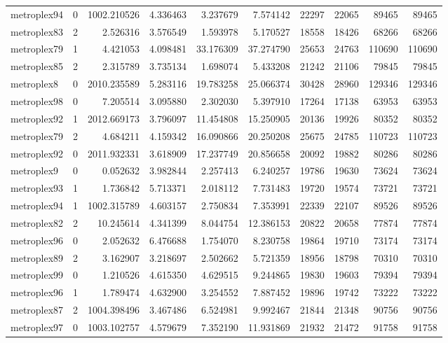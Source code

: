 \begin{longtable}{|l|r|r|r|r|r|r|r|r|r|}
metroplex94 & 0 & 1002.210526 & 4.336463 & 3.237679 & 7.574142 & 22297 & 22065 & 89465 & 89465 \\
metroplex83 & 2 & 2.526316 & 3.576549 & 1.593978 & 5.170527 & 18558 & 18426 & 68266 & 68266 \\
metroplex79 & 1 & 4.421053 & 4.098481 & 33.176309 & 37.274790 & 25653 & 24763 & 110690 & 110690 \\
metroplex85 & 2 & 2.315789 & 3.735134 & 1.698074 & 5.433208 & 21242 & 21106 & 79845 & 79845 \\
metroplex8 & 0 & 2010.235589 & 5.283116 & 19.783258 & 25.066374 & 30428 & 28960 & 129346 & 129346 \\
metroplex98 & 0 & 7.205514 & 3.095880 & 2.302030 & 5.397910 & 17264 & 17138 & 63953 & 63953 \\
metroplex92 & 1 & 2012.669173 & 3.796097 & 11.454808 & 15.250905 & 20136 & 19926 & 80352 & 80352 \\
metroplex79 & 2 & 4.684211 & 4.159342 & 16.090866 & 20.250208 & 25675 & 24785 & 110723 & 110723 \\
metroplex92 & 0 & 2011.932331 & 3.618909 & 17.237749 & 20.856658 & 20092 & 19882 & 80286 & 80286 \\
metroplex9 & 0 & 0.052632 & 3.982844 & 2.257413 & 6.240257 & 19786 & 19630 & 73624 & 73624 \\
metroplex93 & 1 & 1.736842 & 5.713371 & 2.018112 & 7.731483 & 19720 & 19574 & 73721 & 73721 \\
metroplex94 & 1 & 1002.315789 & 4.603157 & 2.750834 & 7.353991 & 22339 & 22107 & 89526 & 89526 \\
metroplex82 & 2 & 10.245614 & 4.341399 & 8.044754 & 12.386153 & 20822 & 20658 & 77874 & 77874 \\
metroplex96 & 0 & 2.052632 & 6.476688 & 1.754070 & 8.230758 & 19864 & 19710 & 73174 & 73174 \\
metroplex89 & 2 & 3.162907 & 3.218697 & 2.502662 & 5.721359 & 18956 & 18798 & 70310 & 70310 \\
metroplex99 & 0 & 1.210526 & 4.615350 & 4.629515 & 9.244865 & 19830 & 19603 & 79394 & 79394 \\
metroplex96 & 1 & 1.789474 & 4.632900 & 3.254552 & 7.887452 & 19896 & 19742 & 73222 & 73222 \\
metroplex87 & 2 & 1004.398496 & 3.467486 & 6.524981 & 9.992467 & 21844 & 21348 & 90756 & 90756 \\
metroplex97 & 0 & 1003.102757 & 4.579679 & 7.352190 & 11.931869 & 21932 & 21472 & 91758 & 91758 \\

\end{longtable}
